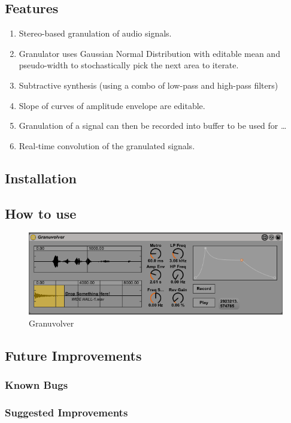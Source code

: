 \documentclass{article}
\begin{document}
		\subsection{Features}
			\begin{enumerate}
				\item Stereo-based granulation of audio signals.
				\item Granulator uses Gaussian Normal Distribution with editable mean and pseudo-width to stochastically pick the next area to iterate.
				\item Subtractive synthesis (using a combo of low-pass and high-pass filters)
				\item Slope of curves of amplitude envelope are editable.
				\item Granulation of a signal can then be recorded into buffer to be used for \ldots
				\item Real-time convolution of the granulated signals.

			\end{enumerate}
		\subsection{Installation}

		\subsection{How to use}
			\begin{figure}[h!]
		  \centering
	    \includegraphics[width=1\textwidth]{images/Granuvolver}
		  \caption{Granuvolver}
			\end{figure}


		\subsection{Future Improvements}
			\subsubsection{Known Bugs}
			\subsubsection{Suggested Improvements}
\end{document}
